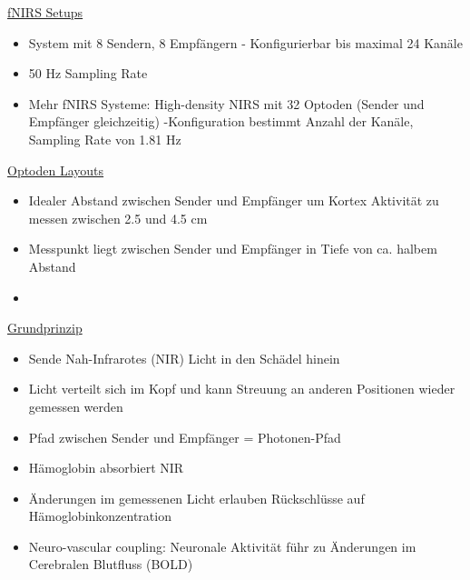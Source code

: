 \documentclass[a4paper,10pt,oneside]{article}
\begin{document}
\underline{fNIRS Setups} \\
	\begin{itemize}
		\item System mit 8 Sendern, 8 Empfängern - Konfigurierbar bis maximal 24 Kanäle 
		\item 50 Hz Sampling Rate
		\item Mehr fNIRS Systeme: High-density NIRS mit 32 Optoden (Sender und Empfänger gleichzeitig) -Konfiguration bestimmt Anzahl der Kanäle, Sampling Rate von 1.81 Hz
	\end{itemize}

\underline{Optoden Layouts} \\
	\begin{itemize}
		\item Idealer Abstand zwischen Sender und Empfänger um Kortex Aktivität zu messen zwischen 2.5 und 4.5 cm
		\item Messpunkt liegt zwischen Sender und Empfänger in Tiefe von ca. halbem Abstand
		\item[] %
	\end{itemize}

\underline{Grundprinzip} \\
	\begin{itemize}
		\item Sende Nah-Infrarotes (NIR) Licht in den Schädel hinein
		\item Licht verteilt sich im Kopf und kann Streuung an anderen Positionen wieder gemessen werden
		\item Pfad zwischen Sender und Empfänger = Photonen-Pfad
		\item Hämoglobin absorbiert NIR
		\item Änderungen im gemessenen Licht erlauben Rückschlüsse auf Hämoglobinkonzentration
		\item Neuro-vascular coupling: Neuronale Aktivität führ zu Änderungen im Cerebralen Blutfluss (BOLD)
	\end{itemize}
 		
\end{document}
